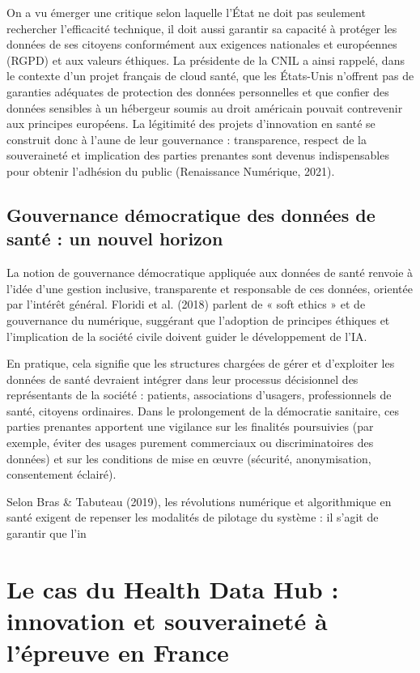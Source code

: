 \documentclass[10pt,a4paper]{article} %
\begin{document}
On a vu émerger une critique selon laquelle l’État ne doit pas seulement rechercher l’efficacité technique, il doit aussi garantir sa capacité à protéger les données de ses citoyens conformément aux exigences nationales et européennes (RGPD) et aux valeurs éthiques. La présidente de la CNIL a ainsi rappelé, dans le contexte d’un projet français de cloud santé, que les États-Unis n’offrent pas de garanties adéquates de protection des données personnelles et que confier des données sensibles à un hébergeur soumis au droit américain pouvait contrevenir aux principes européens. La légitimité des projets d’innovation en santé se construit donc à l’aune de leur gouvernance : transparence, respect de la souveraineté et implication des parties prenantes sont devenus indispensables pour obtenir l’adhésion du public (Renaissance Numérique, 2021).

\subsection{Gouvernance démocratique des données de santé : un nouvel horizon}

La notion de gouvernance démocratique appliquée aux données de santé renvoie à l’idée d’une gestion inclusive, transparente et responsable de ces données, orientée par l’intérêt général. Floridi et al. (2018) parlent de « soft ethics » et de gouvernance du numérique, suggérant que l’adoption de principes éthiques et l’implication de la société civile doivent guider le développement de l’IA.

En pratique, cela signifie que les structures chargées de gérer et d’exploiter les données de santé devraient intégrer dans leur processus décisionnel des représentants de la société : patients, associations d’usagers, professionnels de santé, citoyens ordinaires. Dans le prolongement de la démocratie sanitaire, ces parties prenantes apportent une vigilance sur les finalités poursuivies (par exemple, éviter des usages purement commerciaux ou discriminatoires des données) et sur les conditions de mise en œuvre (sécurité, anonymisation, consentement éclairé).

Selon Bras \& Tabuteau (2019), les révolutions numérique et algorithmique en santé exigent de repenser les modalités de pilotage du système : il s’agit de garantir que l’in

\section{Le cas du Health Data Hub : innovation et souveraineté à l’épreuve en France}
\end{document}
